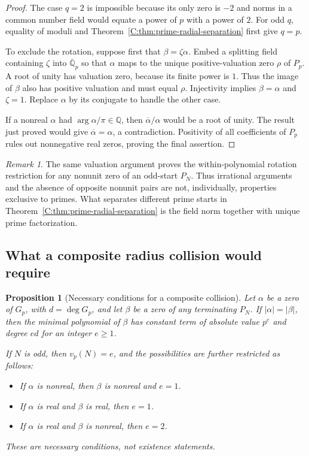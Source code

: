 \documentclass[11pt,a4paper]{article}
\newtheorem{proposition}[theorem]{Proposition}
\theoremstyle{definition}
\theoremstyle{remark}
\newtheorem{remark}[theorem]{Remark}
\numberwithin{equation}{section}
\begin{document}
\begin{proof}
The case $q=2$ is impossible because its only zero is $-2$ and
norms in a common number field would equate a power of $p$ with a
power of $2$. For odd $q$, equality of moduli and
Theorem~\ref{C:thm:prime-radial-separation} first give $q=p$.

To exclude the rotation, suppose first that $\beta=\zeta\alpha$.
Embed a splitting field containing $\zeta$ into
$\overline{\mathbb Q}_p$ so that $\alpha$ maps to the unique
positive-valuation zero $\rho$ of $P_p$. A root of unity has valuation
zero, because its finite power is $1$. Thus the image of $\beta$ also
has positive valuation and must equal $\rho$. Injectivity implies
$\beta=\alpha$ and $\zeta=1$. Replace $\alpha$ by its conjugate to
handle the other case.

If a nonreal $\alpha$ had $\arg\alpha/\pi\in\mathbb Q$, then
$\overline\alpha/\alpha$ would be a root of unity. The result just
proved would give $\overline\alpha=\alpha$, a contradiction.
Positivity of all coefficients of $P_p$ rules out nonnegative real
zeros, proving the final assertion.
\end{proof}

\begin{remark}
The same valuation argument proves the within-polynomial rotation
restriction for any nonunit zero of an odd-start $P_N$. Thus irrational
arguments and the absence of opposite nonunit pairs are not, individually,
properties exclusive to primes. What separates different prime starts in
Theorem~\ref{C:thm:prime-radial-separation} is the field norm together with
unique prime factorization.
\end{remark}

\subsection{What a composite radius collision would require}

\begin{proposition}[Necessary conditions for a composite collision]
\label{C:prop:general-radius-collision}
Let $\alpha$ be a zero of $G_p$, with $d=\deg G_p$, and let $\beta$
be a zero of any terminating $P_N$. If $|\alpha|=|\beta|$, then the
minimal polynomial of $\beta$ has constant term of absolute value
$p^e$ and degree $ed$ for an integer $e\geq1$.

If $N$ is odd, then $v_p(N)=e$, and the possibilities are further
restricted as follows:
\begin{itemize}
\item If $\alpha$ is nonreal, then $\beta$ is nonreal and $e=1$.
\item If $\alpha$ is real and $\beta$ is real, then $e=1$.
\item If $\alpha$ is real and $\beta$ is nonreal, then $e=2$.
\end{itemize}
These are necessary conditions, not existence statements.
\end{proposition}
\end{document}
